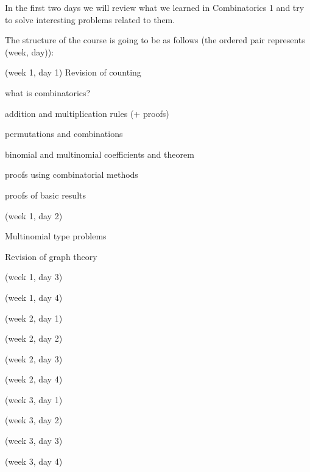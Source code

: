\startchapter [title={Introduction and revision}]
	
	In the first two days we will review what we learned in Combinatorics 1 and try to solve interesting problems related to them.

	The structure of the course is going to be as follows (the ordered pair represents (week, day)):
	\startitemize [m, joinedup]
		\item[w1d1]  (week 1, day 1)  Revision of counting
			\startitemize [a, joinedup]
				\item  what is combinatorics?
				\item  addition and multiplication rules (+ proofs)
				\item  permutations and combinations
				\item  binomial and multinomial coefficients and theorem
				\item  proofs using combinatorial methods
				\item  proofs of basic results
			\stopitemize

		\item[w2d2]  (week 1, day 2)
			\startitemize [a, joinedup]
				\item  Multinomial type problems
				\item  Revision of graph theory
				\item
				\item
			\stopitemize
		  
		\item[w1d3]  (week 1, day 3)
		\item[w1d4]  (week 1, day 4)

		\item[w2d1]  (week 2, day 1)
		\item[w2d2]  (week 2, day 2)
		\item[w2d3]  (week 2, day 3)
		\item[w2d4]  (week 2, day 4)

		\item[w3d1]  (week 3, day 1)
		\item[w3d2]  (week 3, day 2)
		\item[w3d3]  (week 3, day 3)
		\item[w3d4]  (week 3, day 4)
	\stopitemize
\stopchapter
